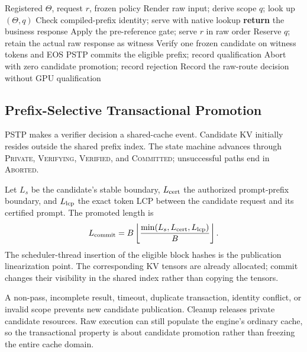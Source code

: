 \begin{algorithm}[t]
\small
\caption{Single-shot query qualification. All work remains on the service clock.}
\label{alg:query}
\begin{algorithmic}[1]
\REQUIRE Registered $\Theta$, request $r$, frozen policy
\STATE Render raw input; derive scope $q$; look up $(\Theta,q)$
  \STATE Check compiled-prefix identity; serve with native lookup
  \STATE \textbf{return} the business response
\ENDIF
\STATE Apply the pre-reference gate; serve $r$ in raw order
  \STATE Reserve $q$; retain the actual raw response as witness
    \STATE Verify one frozen candidate on witness tokens and EOS
      \STATE PSTP commits the eligible prefix; record qualification
    \ELSE
      \STATE Abort with zero candidate promotion; record rejection
    \ENDIF
  \ELSE
    \STATE Record the raw-route decision without GPU qualification
  \ENDIF
\ENDIF
\end{algorithmic}
\end{algorithm}

\subsection{Prefix-Selective Transactional Promotion}
\label{sec:pstp}
PSTP makes a verifier decision a shared-cache event. Candidate KV initially resides outside the shared prefix index. The state machine advances through \textsc{Private}, \textsc{Verifying}, \textsc{Verified}, and \textsc{Committed}; unsuccessful paths end in \textsc{Aborted}.

Let $L_s$ be the candidate's stable boundary, $L_{\rm cert}$ the authorized prompt-prefix boundary, and $L_{\rm lcp}$ the exact token LCP between the candidate request and its certified prompt. The promoted length is
\begin{equation}
 L_{\rm commit}=B\left\lfloor
 \frac{\min(L_s,L_{\rm cert},L_{\rm lcp})}{B}\right\rfloor.
\label{eq:commit}
\end{equation}
The scheduler-thread insertion of the eligible block hashes is the publication linearization point. The corresponding KV tensors are already allocated; commit changes their visibility in the shared index rather than copying the tensors.

A non-pass, incomplete result, timeout, duplicate transaction, identity conflict, or invalid scope prevents new candidate publication. Cleanup releases private candidate resources. Raw execution can still populate the engine's ordinary cache, so the transactional property is about candidate promotion rather than freezing the entire cache domain.

